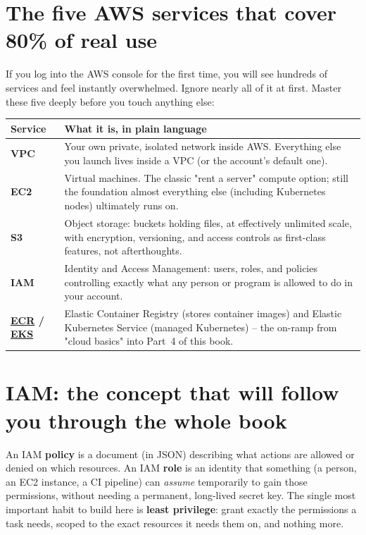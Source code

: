 \documentclass[11pt,twoside,openright]{book}
\newcommand{\acr}[3]{\hyperlink{gls:#1}{#2}\pdfcomment[icon=Comment,color=codekw,open=false]{#3}}
\newcommand{\ECR}{\acr{ECR}{ECR}{Elastic Container Registry: AWS's managed registry for storing and scanning container images.}}
\newcommand{\EKS}{\acr{EKS}{EKS}{Elastic Kubernetes Service: AWS's managed Kubernetes offering.}}
\begin{document}
\section{The five AWS services that cover 80\% of real use}

If you log into the AWS console for the first time, you will see hundreds of services and
feel instantly overwhelmed. Ignore nearly all of it at first. Master these five deeply
before you touch anything else:

\begin{longtable}{|l|p{4.3in}|}
\hline
\textbf{Service} & \textbf{What it is, in plain language} \\
\hline
\endhead
\textbf{VPC} & Your own private, isolated network inside AWS. Everything else you launch
  lives inside a VPC (or the account's default one). \\
\hline
\textbf{EC2} & Virtual machines. The classic "rent a server" compute option; still the
  foundation almost everything else (including Kubernetes nodes) ultimately runs on. \\
\hline
\textbf{S3} & Object storage: buckets holding files, at effectively unlimited scale, with
  encryption, versioning, and access controls as first-class features, not afterthoughts. \\
\hline
\textbf{IAM} & Identity and Access Management: users, roles, and policies controlling
  exactly what any person or program is allowed to do in your account. \\
\hline
\textbf{\ECR{} / \EKS{}} & Elastic Container Registry (stores container images) and Elastic
  Kubernetes Service (managed Kubernetes) -- the on-ramp from "cloud basics" into Part~4
  of this book. \\
\hline
\end{longtable}

\section{IAM: the concept that will follow you through the whole book}

An IAM \textbf{policy} is a document (in JSON) describing what actions are allowed or
denied on which resources. An IAM \textbf{role} is an identity that something (a person, an
EC2 instance, a CI pipeline) can \emph{assume} temporarily to gain those permissions,
without needing a permanent, long-lived secret key. The single most important habit to
build here is \textbf{least privilege}: grant exactly the permissions a task needs, scoped
to the exact resources it needs them on, and nothing more.
\end{document}
